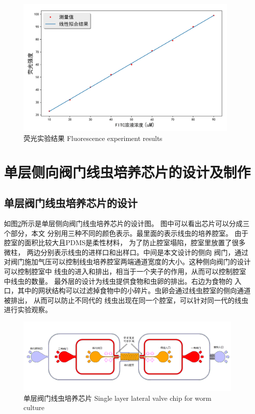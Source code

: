 	\begin{figure}[htbp]
	  \centering
	  \includegraphics[width=11cm]{figure/chap2/fluence.jpg}
	  \bicaption
		{荧光实验结果}
		{Fluorescence experiment results}
	  \label{fig:chap2:fluence}
	\end{figure}
\section{单层侧向阀门线虫培养芯片的设计及制作}
\subsection{单层阀门线虫培养芯片的设计}
    如图\ref{fig:chap2:singlelayer}所示是单层侧向阀门线虫培养芯片的设计图。
	图中可以看出芯片可以分成三个部分，本文
	分别用三种不同的颜色表示。最里面的表示线虫的培养腔室。
	由于腔室的面积比较大且PDMS是柔性材料，
	为了防止腔室塌陷，腔室里放置了很多微柱，
	两边分别表示线虫的进样口和出样口。中间是本文设计的侧向
	阀门，通过对阀门施加气压可以控制线虫培养腔室两端通道宽度的大小。这种侧向阀门的设计可以控制腔室中
	线虫的进入和排出，相当于一个夹子的作用，从而可以控制腔室中线虫的数量。
	最外层的设计为线虫提供食物和虫卵的排出。右边为食物的
	入口，其中的网状结构可以过滤掉食物中的小碎片。虫卵会通过线虫腔室的侧向通道被排出，
	从而可以防止不同代的
	线虫出现在同一个腔室，可以针对同一代的线虫进行实验观察。
\label{subsec:chipdesign}
	\begin{figure}[htbp]
	  \centering
	  \includegraphics[width=14cm]{figure/chap2/arch-chip.png}
	  \bicaption
		{单层阀门线虫培养芯片}
		{Single layer lateral valve chip for  worm culture}
	  \label{fig:chap2:singlelayer}
	\end{figure}
